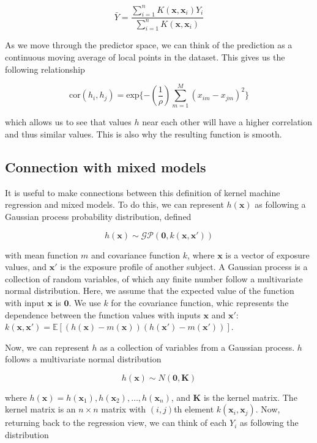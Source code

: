 \documentclass[12pt, twoside]{amherstthesis}
\begin{document}
\[
\bar{Y} = \frac{\sum_{i=1}^n K(\textbf{x}, \textbf{x}_i) Y_i}
{\sum_{i=1}^n K(\textbf{x}, \textbf{x}_i)}
\]

As we move through the predictor space, we can think of the prediction as a continuous moving average of local points in the dataset. This gives us the following relationship

\[
\textrm{cor}(h_i, h_j) = \textrm{exp}\{-(\frac{1}{\rho}) \sum_{m=1}^M
{(x_{im}-x_{jm})^2}\}
\]

\noindent which allows us to see that values \(h\) near each other will have a higher correlation and thus similar values. This is also why the resulting function is smooth.

\hypertarget{connection-with-mixed-models}{%
\subsection{Connection with mixed models}\label{connection-with-mixed-models}}

It is useful to make connections between this definition of kernel machine regression and mixed models. To do this, we can represent \(h(\textbf{x})\) as following a Gaussian process probability distribution, defined

\[
h(\textbf{x}) \sim \mathcal{GP}(\textbf{0}, k(\textbf{x}, \textbf{x}'))
\]

with mean function \(m\) and covariance function \(k\), where \(\textbf{x}\) is a vector of exposure values, and \(\textbf{x}'\) is the exposure profile of another subject. A Gaussian process is a collection of random variables, of which any finite number follow a multivariate normal distribution. Here, we assume that the expected value of the function with input \(\textbf{x}\) is \(\textbf{0}\). We use \(k\) for the covariance function, whic represents the dependence between the function values with inputs \(\textbf{x}\) and \(\textbf{x}'\): \(k(\textbf{x}, \textbf{x}') = \mathbb{E}[(h(\textbf{x})-m(\textbf{x})) (h(\textbf{x}')-m(\textbf{x}'))]\).

Now, we can represent \(h\) as a collection of variables from a Gaussian process. \(h\) follows a multivariate normal distribution

\[
h({\textbf{x}}) \sim N(\textbf{0}, \textbf{K})
\]

\noindent where \(h({\textbf{x}}) = h(\textbf{x}_1), h(\textbf{x}_2), \dots, h(\textbf{x}_n)\), and \(\textbf{K}\) is the kernel matrix. The kernel matrix is an \(n \times n\) matrix with \((i, j)\)th element \(k(\textbf{x}_i, \textbf{x}_j)\). Now, returning back to the regression view, we can think of each \(Y_i\) as following the distribution
\end{document}
